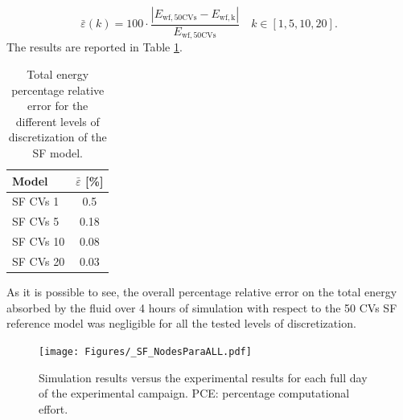 \documentclass[final,3p,times,review]{elsarticle}
\begin{document}
%
\begin{equation}
\bar{\varepsilon}(k) = 100 \cdot \frac{|E_\mathrm{wf,50CVs} -E_\mathrm{wf,k}|}{E_\mathrm{wf,50CVs}}  \quad k \in [1,5,10,20]. 
\end{equation}
%
The results are reported in Table \ref{tab:SF_Etot}.
%
\begin{table}[h!]
  \centering
  \caption{Total energy percentage relative error for the different levels of discretization of the SF model.}
    \begin{tabular}{lc}
    \toprule
    Model & \multicolumn{1}{c}{$\bar{\varepsilon}$ [\%]}  \\
    \midrule
    SF CVs 1      & 0.5         \\
    SF CVs 5      & 0.18         \\
    SF CVs 10     & 0.08          \\
    SF CVs 20     & 0.03          \\   
    \bottomrule
    \end{tabular}%
  \label{tab:SF_Etot}%
\end{table}%
%
As it is possible to see, the overall percentage relative error on the total energy absorbed by the fluid over 4 hours of simulation with respect to the 50 CVs SF reference model was negligible for all the tested levels of discretization.\\

\begin{landscape}
\begin{figure}[h!]
\centering
\texttt{[image: Figures/\_SF\_NodesParaALL.pdf]}
\caption{Simulation results versus the experimental results for each full day of the experimental campaign. PCE: percentage computational effort.}
\label{fig:SF_ModRes_ParAnalysis}
\end{figure}
\end{landscape}
%
%
%

%


%
\end{document}
